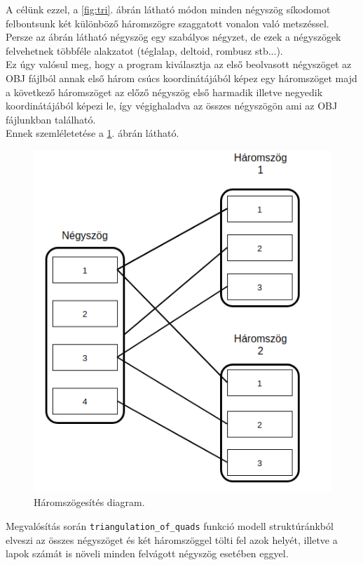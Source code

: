 \noindent A célünk ezzel, a \ref{fig:tri}. ábrán  látható módon minden négyszög síkodomot felbontsunk két különböző háromszögre szaggatott vonalon való metszéssel. Persze az ábrán látható négyszög egy szabályos négyzet, de ezek a négyszögek felvehetnek többféle alakzatot (téglalap, deltoid, rombusz stb...).\\

Ez úgy valósul meg, hogy a program kiválasztja az első beolvasott négyszöget az OBJ fájlból annak első három csúcs koordinátájából képez egy háromszöget majd a következő háromszöget az előző négyszög első harmadik illetve negyedik koordinátájából képezi le, így végighaladva az összes négyszögön ami az OBJ fájlunkban található.\\Ennek szemléletetése a \ref{fig:tri1}. ábrán látható.
\begin{figure}[h]
\centering
\includegraphics[scale=0.39]{images/haromszog.png}
\caption{Háromszögesítés diagram.}
\label{fig:tri1}
\end{figure}

Megvalósítás során \texttt{triangulation\_of\_quads} funkció modell struktúránkból elveszi az összes négyszöget és két háromszöggel tölti fel azok helyét, illetve a lapok számát is növeli minden felvágott négyszög esetében eggyel.

